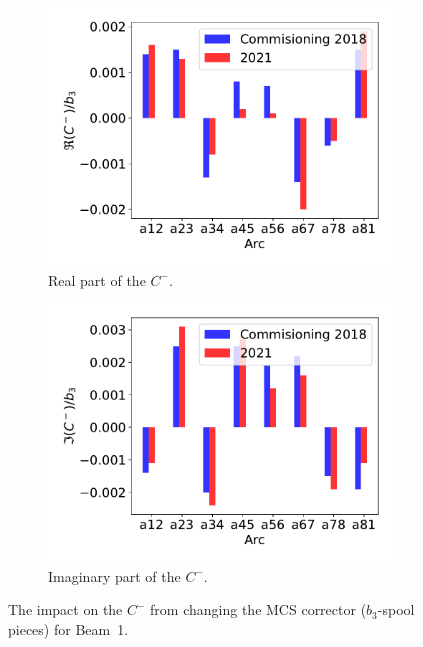 \documentclass{cernatsnote}
\begin{document}
\begin{figure}[ht]
\begin{subfigure}{.5\textwidth}
  \centering
  \includegraphics[width=.8\linewidth]{inj_linear/beamtest/MCS/b_1change_re_per_b3.pdf}  
  \caption{Real part of the $C^-$.}
\end{subfigure}
\begin{subfigure}{.5\textwidth}
  \centering
  \includegraphics[width=.8\linewidth]{inj_linear/beamtest/MCS/b_1change_im_per_b3.pdf}  
  \caption{Imaginary part of the $C^-$.}
\end{subfigure}
\caption{The impact on the $C^-$ from changing the MCS corrector ($b_3$-spool pieces) for Beam~1. }
\label{fig:beam1_mcs}
\end{figure}
\end{document}
